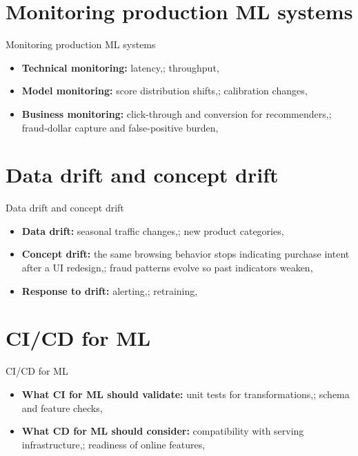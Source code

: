 \documentclass[aspectratio=169]{beamer}
\begin{document}
\section{Monitoring production ML systems}

\begin{frame}{Monitoring production ML systems}
  \begin{itemize}
    \item \textbf{Technical monitoring:} latency,; throughput,
    \item \textbf{Model monitoring:} score distribution shifts,; calibration changes,
    \item \textbf{Business monitoring:} click-through and conversion for recommenders,; fraud-dollar capture and false-positive burden,
  \end{itemize}
\end{frame}

\section{Data drift and concept drift}

\begin{frame}{Data drift and concept drift}
  \begin{itemize}
    \item \textbf{Data drift:} seasonal traffic changes,; new product categories,
    \item \textbf{Concept drift:} the same browsing behavior stops indicating purchase intent after a UI redesign,; fraud patterns evolve so past indicators weaken,
    \item \textbf{Response to drift:} alerting,; retraining,
  \end{itemize}
\end{frame}

\section{CI/CD for ML}

\begin{frame}{CI/CD for ML}
  \begin{itemize}
    \item \textbf{What CI for ML should validate:} unit tests for transformations,; schema and feature checks,
    \item \textbf{What CD for ML should consider:} compatibility with serving infrastructure,; readiness of online features,
  \end{itemize}
\end{frame}
\end{document}

